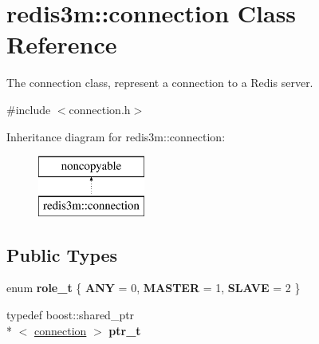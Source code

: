 \hypertarget{classredis3m_1_1connection}{\section{redis3m\-:\-:connection Class Reference}
\label{classredis3m_1_1connection}
}


The connection class, represent a connection to a Redis server.  




{\ttfamily \#include $<$connection.\-h$>$}

Inheritance diagram for redis3m\-:\-:connection\-:\begin{figure}[H]
\begin{center}
\leavevmode
\includegraphics[height=2.000000cm]{classredis3m_1_1connection}
\end{center}
\end{figure}
\subsection*{Public Types}
\begin{DoxyCompactItemize}
\item 
enum {\bfseries role\-\_\-t} \{ {\bfseries A\-N\-Y} = 0, 
{\bfseries M\-A\-S\-T\-E\-R} = 1, 
{\bfseries S\-L\-A\-V\-E} = 2
 \}
\item 
\hypertarget{classredis3m_1_1connection_a6e3fffb8c2b60128baf8ef0e9b78cbd3}{typedef boost\-::shared\-\_\-ptr\\*
$<$ \hyperlink{classredis3m_1_1connection}{connection} $>$ {\bfseries ptr\-\_\-t}}\label{classredis3m_1_1connection_a6e3fffb8c2b60128baf8ef0e9b78cbd3}

\end{DoxyCompactItemize}
